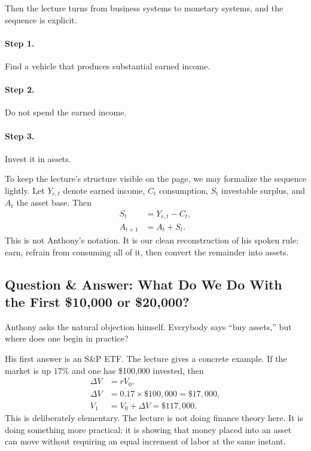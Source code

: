 Then the lecture turns from business systems to monetary systems, and the sequence is explicit.

\paragraph{Step 1.} Find a vehicle that produces substantial earned income.

\paragraph{Step 2.} Do not spend the earned income.

\paragraph{Step 3.} Invest it in assets.

To keep the lecture's structure visible on the page, we may formalize the sequence lightly. Let \(Y_{e,t}\) denote earned income, \(C_t\) consumption, \(S_t\) investable surplus, and \(A_t\) the asset base. Then
\begin{align}
S_t &= Y_{e,t} - C_t,\\
A_{t+1} &= A_t + S_t.
\end{align}
This is not Anthony's notation. It is our clean reconstruction of his spoken rule: earn, refrain from consuming all of it, then convert the remainder into assets.

\subsection{Question \& Answer: What Do We Do With the First \$10{,}000 or \$20{,}000?}

Anthony asks the natural objection himself. Everybody says ``buy assets,'' but where does one begin in practice?

His first answer is an S\&P ETF. The lecture gives a concrete example. If the market is up \(17\%\) and one has \$100{,}000 invested, then
\begin{align}
\Delta V &= rV_0,\\
\Delta V &= 0.17 \times \$100{,}000 = \$17{,}000,\\
V_1 &= V_0 + \Delta V = \$117{,}000.
\end{align}
This is deliberately elementary. The lecture is not doing finance theory here. It is doing something more practical: it is showing that money placed into an asset can move without requiring an equal increment of labor at the same instant.

